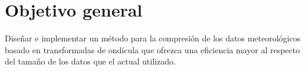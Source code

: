 \section{Objetivo general}

Diseñar e implementar un método para la compresión de los datos meteorológicos basado en transformadas de ondícula que ofrezca una eficiencia mayor al respecto del tamaño de los datos que el actual utilizado.
